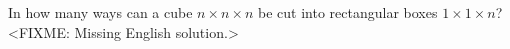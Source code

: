 \problem
In how many ways can a cube $n \times n \times n$ be cut into rectangular boxes
$1 \times 1 \times n$?
\solution
<FIXME: Missing English solution.>
\endproblem
